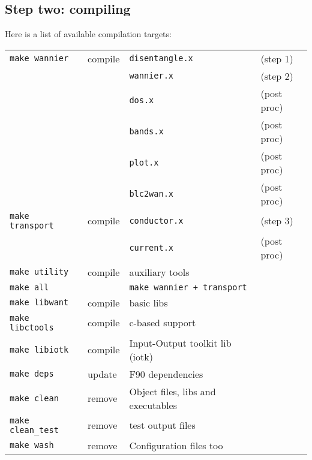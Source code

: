 \newpage
\subsection{Step two: compiling}
\noindent Here is a list of available compilation targets: \\

%
%
\begin{tabular}{llll}
  \texttt{make wannier}    &  compile & \texttt{disentangle.x} &(step 1)\\
  \texttt{}                &          & \texttt{wannier.x}     &(step 2)\\
  \texttt{}                &          & \texttt{dos.x}         &(post proc)\\
  \texttt{}                &          & \texttt{bands.x}       &(post proc)\\
  \texttt{}                &          & \texttt{plot.x}        &(post proc)\\
  \texttt{}                &          & \texttt{blc2wan.x}     &(post proc)\\
  \texttt{make transport}  &  compile & \texttt{conductor.x}   &(step 3)\\
  \texttt{}                &          & \texttt{current.x}     &(post proc)\\
  \texttt{make utility}    &  compile & auxiliary tools        &\\
  \texttt{make all}        &          & \texttt{make wannier + transport} & \\
  \texttt{make libwant}    &  compile & \WANT{} basic libs       &        \\
  \texttt{make libctools}  &  compile & c-based support       &        \\
  \texttt{make libiotk}    &  compile & Input-Output toolkit lib (iotk)  &        \\
  \texttt{make deps}       &  update  & F90 dependencies &    \\ 
  \texttt{make clean}      &  remove  & Object files, libs and executables &    \\ 
  \texttt{make clean\_test}&  remove  & test output files &    \\ 
  \texttt{make wash}       &  remove  & Configuration files too        &  
\end{tabular}
%
%
\\

